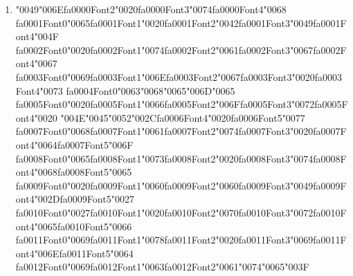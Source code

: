 \documentclass[11pt]{article}
\begin{document}
\begin{enumerate}[label=Q\arabic*., leftmargin=*]
\item {\char"0049}{\char"006E}{\csname fa0000Font2\endcsname\char"0020}{\csname fa0000Font3\endcsname\char"0074}{\csname fa0000Font4\endcsname\char"0068} {\csname fa0001Font0\endcsname\char"0065}{\csname fa0001Font1\endcsname\char"0020}{\csname fa0001Font2\endcsname\char"0042}{\csname fa0001Font3\endcsname\char"0049}{\csname fa0001Font4\endcsname\char"004F} {\csname fa0002Font0\endcsname\char"0020}{\csname fa0002Font1\endcsname\char"0074}{\csname fa0002Font2\endcsname\char"0061}{\csname fa0002Font3\endcsname\char"0067}{\csname fa0002Font4\endcsname\char"0067} {\csname fa0003Font0\endcsname\char"0069}{\csname fa0003Font1\endcsname\char"006E}{\csname fa0003Font2\endcsname\char"0067}{\csname fa0003Font3\endcsname\char"0020}{\csname fa0003Font4\endcsname\char"0073} {\csname fa0004Font0\endcsname\char"0063}{\char"0068}{\char"0065}{\char"006D}{\char"0065} {\csname fa0005Font0\endcsname\char"0020}{\csname fa0005Font1\endcsname\char"0066}{\csname fa0005Font2\endcsname\char"006F}{\csname fa0005Font3\endcsname\char"0072}{\csname fa0005Font4\endcsname\char"0020} {\char"004E}{\char"0045}{\char"0052}{\char"002C}{\csname fa0006Font4\endcsname\char"0020}{\csname fa0006Font5\endcsname\char"0077} {\csname fa0007Font0\endcsname\char"0068}{\csname fa0007Font1\endcsname\char"0061}{\csname fa0007Font2\endcsname\char"0074}{\csname fa0007Font3\endcsname\char"0020}{\csname fa0007Font4\endcsname\char"0064}{\csname fa0007Font5\endcsname\char"006F} {\csname fa0008Font0\endcsname\char"0065}{\csname fa0008Font1\endcsname\char"0073}{\csname fa0008Font2\endcsname\char"0020}{\csname fa0008Font3\endcsname\char"0074}{\csname fa0008Font4\endcsname\char"0068}{\csname fa0008Font5\endcsname\char"0065} {\csname fa0009Font0\endcsname\char"0020}{\csname fa0009Font1\endcsname\char"0060}{\csname fa0009Font2\endcsname\char"0060}{\csname fa0009Font3\endcsname\char"0049}{\csname fa0009Font4\endcsname\char"002D}{\csname fa0009Font5\endcsname\char"0027} {\csname fa0010Font0\endcsname\char"0027}{\csname fa0010Font1\endcsname\char"0020}{\csname fa0010Font2\endcsname\char"0070}{\csname fa0010Font3\endcsname\char"0072}{\csname fa0010Font4\endcsname\char"0065}{\csname fa0010Font5\endcsname\char"0066} {\csname fa0011Font0\endcsname\char"0069}{\csname fa0011Font1\endcsname\char"0078}{\csname fa0011Font2\endcsname\char"0020}{\csname fa0011Font3\endcsname\char"0069}{\csname fa0011Font4\endcsname\char"006E}{\csname fa0011Font5\endcsname\char"0064} {\csname fa0012Font0\endcsname\char"0069}{\csname fa0012Font1\endcsname\char"0063}{\csname fa0012Font2\endcsname\char"0061}{\char"0074}{\char"0065}{\char"003F}


\end{enumerate}
\end{document}
